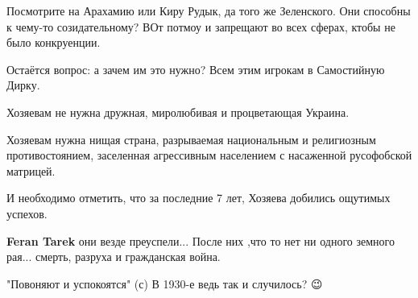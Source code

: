 \begin{itemize}
\begin{itemize}
Посмотрите на Арахамию или Киру Рудык, да того же Зеленского. Они способны к
чему-то созидательному? ВОт потмоу и запрещают во всех сферах, ктобы не было
конкруенции.
\end{itemize}

 
Остаётся вопрос: а зачем им это нужно? Всем этим игрокам в Самостийную Дирку.

 
Хозяевам не нужна дружная, миролюбивая и процветающая Украина.

Хозяевам нужна нищая страна, разрываемая национальным и религиозным
противостоянием, заселенная агрессивным населением с насаженной русофобской
матрицей.

И необходимо отметить, что за последние 7 лет, Хозяева добились ощутимых
успехов.

\begin{itemize}
 
\textbf{Feran Tarek} они везде преуспели... После них ,что то нет ни одного земного рая... смерть, разруха и гражданская война.
\end{itemize}

 
"Повоняют и успокоятся" (с)
В 1930-е ведь так и случилось? 😉

 


\end{itemize}

